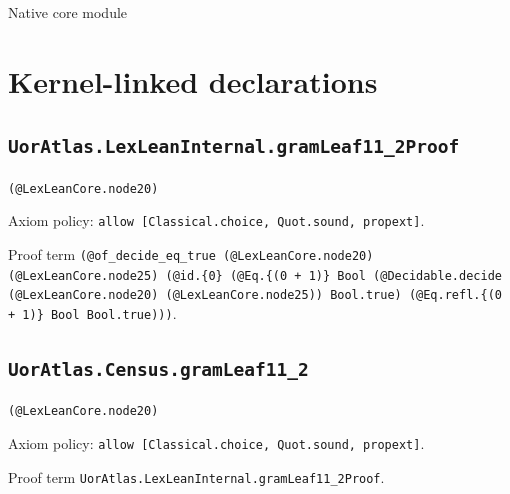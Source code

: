 \documentclass[11pt]{article}
\begin{document}
\begin{center}{\LARGE Native core module}\end{center}
\section*{Kernel-linked declarations}
\subsection*{\texttt{UorAtlas.LexLeanInternal.gramLeaf11\_2Proof}}
\noindent\texttt{(@LexLeanCore.node20)}\par
\noindent Axiom policy: \texttt{allow [Classical.choice, Quot.sound, propext]}.\par
\noindent Proof term \texttt{(@of\_decide\_eq\_true (@LexLeanCore.node20) (@LexLeanCore.node25) (@id.\{0\} (@Eq.\{(0 + 1)\} Bool (@Decidable.decide (@LexLeanCore.node20) (@LexLeanCore.node25)) Bool.true) (@Eq.refl.\{(0 + 1)\} Bool Bool.true)))}.\par
\subsection*{\texttt{UorAtlas.Census.gramLeaf11\_2}}
\noindent\texttt{(@LexLeanCore.node20)}\par
\noindent Axiom policy: \texttt{allow [Classical.choice, Quot.sound, propext]}.\par
\noindent Proof term \texttt{UorAtlas.LexLeanInternal.gramLeaf11\_2Proof}.\par
\end{document}
